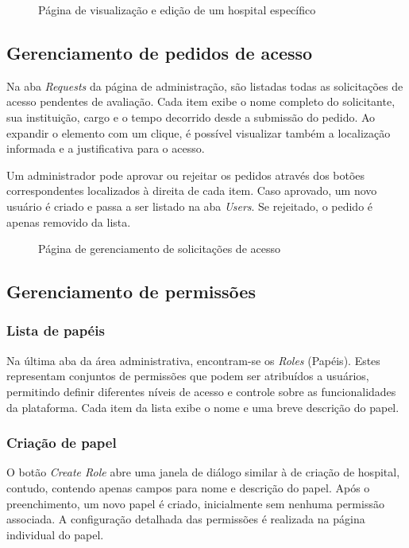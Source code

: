 \documentclass{article}
\newcommand{\image}[2]{
    \begin{figure}[H]
        \fcolorbox{light-gray}{white}{\texttt{[image: \#1]}}
        \caption{#2}
    \end{figure}
}
\begin{document}
\image{07.png}{Página de visualização e edição de um hospital específico}

\subsection{Gerenciamento de pedidos de acesso}

Na aba \textit{Requests} da página de administração, são listadas todas as solicitações de acesso pendentes de avaliação. Cada item exibe o nome completo do solicitante, sua instituição, cargo e o tempo decorrido desde a submissão do pedido. Ao expandir o elemento com um clique, é possível visualizar também a localização informada e a justificativa para o acesso.

Um administrador pode aprovar ou rejeitar os pedidos através dos botões correspondentes localizados à direita de cada item. Caso aprovado, um novo usuário é criado e passa a ser listado na aba \textit{Users}. Se rejeitado, o pedido é apenas removido da lista.

\image{08.png}{Página de gerenciamento de solicitações de acesso}

\subsection{Gerenciamento de permissões}

\subsubsection{Lista de papéis}

Na última aba da área administrativa, encontram-se os \textit{Roles} (Papéis). Estes representam conjuntos de permissões que podem ser atribuídos a usuários, permitindo definir diferentes níveis de acesso e controle sobre as funcionalidades da plataforma. Cada item da lista exibe o nome e uma breve descrição do papel.

\subsubsection{Criação de papel}

O botão \textit{Create Role} abre uma janela de diálogo similar à de criação de hospital, contudo, contendo apenas campos para nome e descrição do papel. Após o preenchimento, um novo papel é criado, inicialmente sem nenhuma permissão associada. A configuração detalhada das permissões é realizada na página individual do papel.
\end{document}

